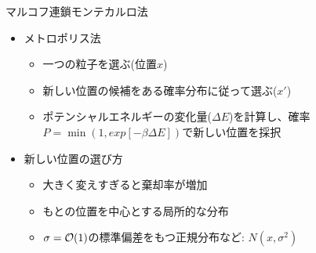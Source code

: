 \begin{frame}[t,fragile]{マルコフ連鎖モンテカルロ法}
  \begin{itemize}
    \setlength{\itemsep}{1em}
  \item メトロポリス法
    \begin{itemize}
    \item 一つの粒子を選ぶ(位置$x$)
    \item 新しい位置の候補をある確率分布に従って選ぶ($x'$)
    \item ポテンシャルエネルギーの変化量($\Delta E$)を計算し、確率$P=\min(1,exp[-\beta\Delta E])$で新しい位置を採択
    \end{itemize}
  \item 新しい位置の選び方
    \begin{itemize}
    \item 大きく変えすぎると棄却率が増加
    \item もとの位置を中心とする局所的な分布
    \item $\sigma={\cal O}(1)$の標準偏差をもつ正規分布など: $N(x, \sigma^2)$
    \end{itemize}
  \end{itemize}
\end{frame}


